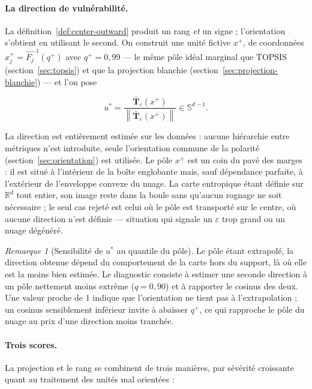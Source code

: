 \documentclass[11pt,a4paper]{article}
\theoremstyle{definition}
\theoremstyle{remark}
\newtheorem{remarque}{Remarque}[section]
\newcommand{\R}{\mathbb{R}}
\newcommand{\Sphere}{\mathbb{S}}
\newcommand{\norm}[1]{\left\lVert #1 \right\rVert}
\newcommand{\Tmap}{\mathbf{T}}
\begin{document}
\bigskip

\paragraph{La direction de vulnérabilité.} La définition~\ref{def:center-outward} produit
un rang \emph{et} un signe ; l'orientation s'obtient en utilisant le second. On construit
une unité fictive $x^{+}$, de coordonnées $x^{+}_j = \hat{F}_j^{-1}(q^{+})$ avec
$q^{+} = 0{,}99$ --- le même pôle idéal marginal que TOPSIS (section~\ref{sec:topsis}) et
que la projection blanchie (section~\ref{sec:projection-blanchie}) --- et l'on pose

\medskip

\[
  u^{*} = \frac{\bar{\Tmap}_\varepsilon(x^{+})}{\norm{\bar{\Tmap}_\varepsilon(x^{+})}}
  \in \Sphere^{d-1}.
\]

\bigskip

La direction est entièrement estimée sur les données : aucune hiérarchie entre métriques
n'est introduite, seule l'orientation commune de la polarité (section~\ref{sec:orientation})
est utilisée. Le pôle $x^{+}$ est un coin du pavé des marges : il est situé à l'intérieur de
la boîte englobante mais, sauf dépendance parfaite, à l'extérieur de l'enveloppe convexe du
nuage. La carte entropique étant définie sur $\R^d$ tout entier, son image reste dans la
boule sans qu'aucun rognage ne soit nécessaire ; le seul cas rejeté est celui où le pôle est
transporté sur le centre, où aucune direction n'est définie --- situation qui signale un
$\varepsilon$ trop grand ou un nuage dégénéré.

\medskip

\begin{remarque}[Sensibilité de $u^{*}$ au quantile du pôle]
  \label{rem:ot-direction}
  Le pôle étant extrapolé, la direction obtenue dépend du comportement de la carte hors du
  support, là où elle est la moins bien estimée. Le diagnostic consiste à estimer une
  seconde direction à un pôle nettement moins extrême ($q = 0{,}90$) et à rapporter le
  cosinus des deux. Une valeur proche de $1$ indique que l'orientation ne tient pas à
  l'extrapolation ; un cosinus sensiblement inférieur invite à abaisser $q^{+}$, ce qui
  rapproche le pôle du nuage au prix d'une direction moins tranchée.
\end{remarque}

\bigskip

\paragraph{Trois scores.} La projection et le rang se combinent de trois manières, par
sévérité croissante quant au traitement des unités mal orientées :
\end{document}
